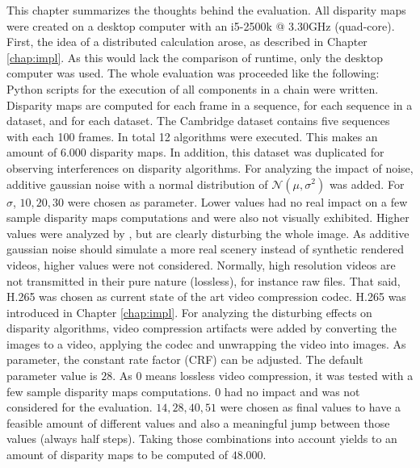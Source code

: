 This chapter summarizes the thoughts behind the evaluation.
All disparity maps were created on a desktop computer with an i5-2500k @ 3.30GHz (quad-core).
First, the idea of a distributed calculation arose, as described in Chapter \ref{chap:impl}.
As this would lack the comparison of runtime, only the desktop computer was used.
\newline\newline\noindent The whole evaluation was proceeded like the following:
Python scripts for the execution of all components in a chain were written.
Disparity maps are computed for each frame in a sequence, for each sequence in a dataset, and for each dataset.
The Cambridge dataset contains five sequences with each 100 frames.
In total 12 algorithms were executed.
This makes an amount of $6.000$ disparity maps.
\newline\newline\noindent In addition, this dataset was duplicated for observing interferences on disparity algorithms.
For analyzing the impact of noise, additive gaussian noise with a normal distribution of $\mathcal{N}(\mu,\sigma^2)$ was added.
For $\sigma$, $10, 20, 30$ were chosen as parameter.
Lower values had no real impact on a few sample disparity maps computations and were also not visually exhibited.
Higher values were analyzed by \citeauthor{richardt2010real} \citep{richardt2010real}, but are clearly disturbing the whole image.
As additive gaussian noise should simulate a more real scenery instead of synthetic rendered videos, higher values were not considered.
\newline\newline\noindent Normally, high resolution videos are not transmitted in their pure nature (lossless), for instance raw files.
That said, H.265 was chosen as current state of the art video compression codec.
H.265 was introduced in Chapter \ref{chap:impl}.
For analyzing the disturbing effects on disparity algorithms, video compression artifacts were added by converting the images to a video, applying the codec and unwrapping the video into images.
As parameter, the constant rate factor (CRF) can be adjusted.
The default parameter value is $28$.
As $0$ means lossless video compression, it was tested with a few sample disparity maps computations.
$0$ had no impact and was not considered for the evaluation.
$14, 28, 40, 51$ were chosen as final values to have a feasible amount of different values and also a meaningful jump between those values (always half steps).
\newline\newline\noindent Taking those combinations into account yields to an amount of disparity maps to be computed of $48.000$.
